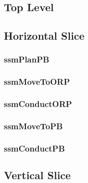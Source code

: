 \documentclass[../../main/main.tex]{subfiles}
\begin{document}
\subsection{Top Level}\label{ssec:toplevel}

\subsection{Horizontal Slice}\label{ssec:horizontalslice}

\subsubsection{ssmPlanPB}\label{sssec:ssmPlanPB}

\subsubsection{ssmMoveToORP}\label{sssec:ssmMoveToORP}

\subsubsection{ssmConductORP}\label{sssec:ssmConductORP}

\subsubsection{ssmMoveToPB}\label{sssec:ssmMoveToPB}

\subsubsection{ssmConductPB}\label{sssec:ssmConductPB}

\subsection{Vertical Slice}\label{ssec:verticalslice}
\end{document}
